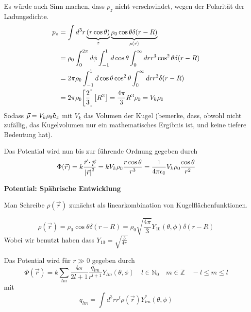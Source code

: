 \begin{enumerate}[label=\alph*)]
    Es würde auch Sinn machen, dass $p_z$ nicht verschwindet, wegen der
    Polarität der Ladungsdichte.
    \begin{equation*}
      \begin{split}
        p_z
        &=\int d^3 r \underbrace{(r \cos\theta)}_{z} 
        \underbrace{\rho_0 \cos\theta \delta(r-R)}_{\rho(\vec r)}\\
        &=
        \rho_0
        \int_0^{2\pi}d\phi
        \int_{-1}^{1}d\cos\theta 
        \int_0^{\infty} dr r^3 \cos^2\theta \delta(r-R)\\
        &=
        2\pi\rho_0
        \int_{-1}^{1}d\cos\theta \cos^2\theta 
        \int_0^{\infty} dr r^3 \delta(r-R)\\
        &=
        2\pi\rho_0
        \qty[\frac{2}{3}]
        \qty[R^3]
        =
        \frac{4\pi}{3}R^3 \rho_0
        =V_k \rho_0
      \end{split}
    \end{equation*}
    Sodass $\vec p=V_k\rho_0 \vu e_z$ mit $V_k$ das Volumen der Kugel
    (bemerke, dass, obwohl nicht zufällig, das Kugelvolumen nur ein
    mathematisches Ergibnis ist, und keine tiefere Bedeutung hat).

    Das Potential wird nun bis zur führende Ordnung gegeben durch
    \begin{equation}
      \Phi(\vec r)= k\frac{\vec r\cdot\vec p}{\abs{\vec r}^3}
      = kV_k\rho_0 \frac{r\cos\theta}{r^3} 
      = \frac{1}{4\pi\epsilon_0} V_k\rho_0 \frac{\cos\theta}{r^2} 
    \end{equation}

    \textbf{Potential: Spährische Entwicklung} 
    
    Man Schreibe $\rho(\vec r)$ zunächst als linearkombination von
    Kugelflächenfunktionen.

    \begin{equation*}
      \rho(\vec r)
      =\rho_0\cos\theta\delta(r-R)
      =\rho_0\sqrt{\frac{4\pi}{3}}Y_{10}(\theta,\phi)\delta(r-R)
    \end{equation*}
    Wobei wir benutzt haben dass $Y_{10}=\sqrt{\frac{3}{4\pi}}$

    Das Potential wird für $r\gg0$ gegeben durch
    \begin{equation}
      \Phi(\vec r)
      =k\sum_{lm}\frac{4\pi}{2l+1}\frac{q_{lm}}{r^{l+1}}Y_{lm}(\theta,\phi)
      \quad l\in\mathbb{N}_0\quad m\in\mathbb{Z}\quad -l\le m\le l
    \end{equation}
    mit
    \begin{equation}
      q_{lm}=\int d^3 r r^l \rho(\vec r) Y^*_{lm}(\theta,\phi)
    \end{equation}
    

\end{enumerate}
